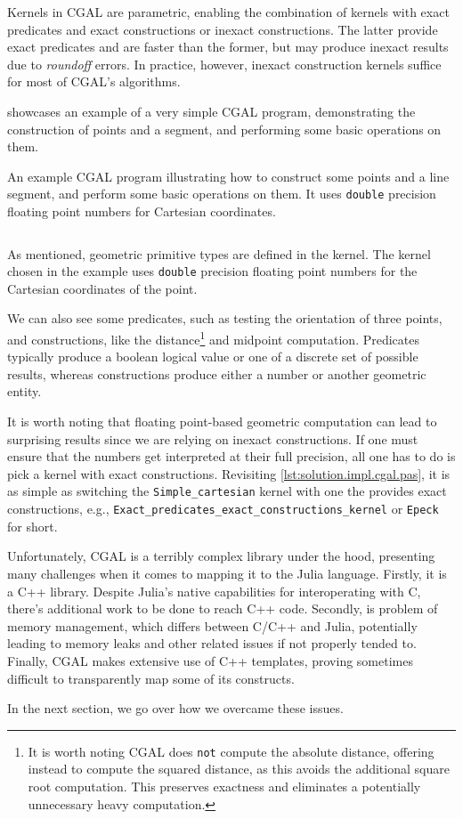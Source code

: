 Kernels in \ac{CGAL} are parametric, enabling the combination of kernels with
exact predicates and exact constructions or inexact constructions.  The latter
provide exact predicates and are faster than the former, but may produce inexact
results due to \textit{roundoff} errors.  In practice, however, inexact
construction kernels suffice for most of \ac{CGAL}'s algorithms.

 showcases an example of a very simple
\ac{CGAL} program, demonstrating the construction of points and a segment, and
performing some basic operations on them.

\begin{listing}[htbp]
  \caption[CGAL: Three points and one segment]{
    An example CGAL program illustrating how to construct some points and a line
    segment, and perform some basic operations on them.  It uses
    \texttt{double} precision floating point numbers for Cartesian
    coordinates.}\label{lst:solution.impl.cgal.pas}
  \inputminted{cpp}{cpp/points_and_segments.cpp}
\end{listing}

As mentioned, geometric primitive types are defined in the kernel.  The kernel
chosen in the example uses \texttt{double} precision floating point numbers for
the Cartesian coordinates of the point.

We can also see some predicates, such as testing the orientation of three
points, and constructions, like the distance\footnote{It is worth noting
\ac{CGAL} does \texttt{not} compute the absolute distance, offering instead to
compute the squared distance, as this avoids the additional square root
computation.  This preserves exactness and eliminates a potentially unnecessary
heavy computation.} and midpoint computation.  Predicates typically produce a
boolean logical value or one of a discrete set of possible results, whereas
constructions produce either a number or another geometric entity.

It is worth noting that floating point-based geometric computation can lead to
surprising results since we are relying on inexact constructions.  If one must
ensure that the numbers get interpreted at their full precision, all one has to
do is pick a kernel with exact constructions.  Revisiting
\cref{lst:solution.impl.cgal.pas}, it is as simple as switching the
\texttt{Simple\_cartesian} kernel with one the provides exact constructions,
e.g., \texttt{Exact\_predicates\_exact\_constructions\_kernel} or \texttt{Epeck}
for short.

Unfortunately, \ac{CGAL} is a terribly complex library under the hood,
presenting many challenges when it comes to mapping it to the Julia language.
Firstly, it is a C++ library.  Despite Julia's native capabilities for
interoperating with C, there's additional work to be done to reach C++ code.
Secondly, is problem of memory management, which differs between C/C++ and
Julia, potentially leading to memory leaks and other related issues if not
properly tended to.  Finally, \ac{CGAL} makes extensive use of C++ templates,
proving sometimes difficult to transparently map some of its constructs.

In the next section, we go over how we overcame these issues.
